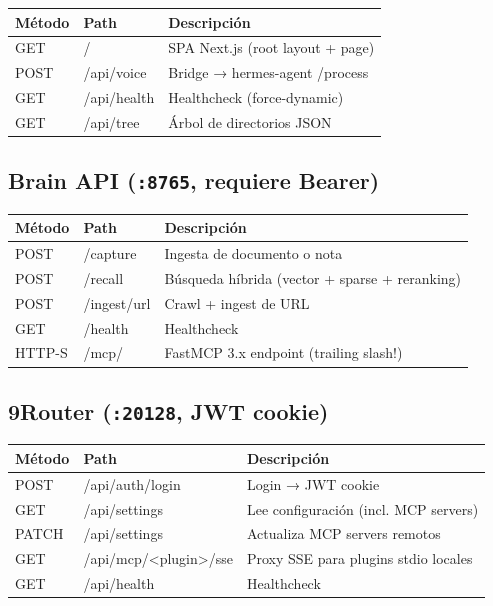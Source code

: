 \documentclass[11pt,a4paper]{article}
\begin{document}
\begin{center}
\begin{tabular}{|l|l|l|}
\hline
\rowcolor{hermesblue}\color{white}\textbf{Método} & \color{white}\textbf{Path} & \color{white}\textbf{Descripción}\\
\hline
GET & / & SPA Next.js (root layout + page)\\
POST & /api/voice & Bridge → hermes-agent /process\\
GET & /api/health & Healthcheck (force-dynamic)\\
GET & /api/tree & Árbol de directorios JSON\\
\hline
\end{tabular}
\end{center}

\subsection{Brain API (\texttt{:8765}, requiere Bearer)}

\begin{center}
\begin{tabular}{|l|l|l|}
\hline
\rowcolor{hermesblue}\color{white}\textbf{Método} & \color{white}\textbf{Path} & \color{white}\textbf{Descripción}\\
\hline
POST & /capture & Ingesta de documento o nota\\
POST & /recall & Búsqueda híbrida (vector + sparse + reranking)\\
POST & /ingest/url & Crawl + ingest de URL\\
GET & /health & Healthcheck\\
HTTP-S & /mcp/ & FastMCP 3.x endpoint (trailing slash!)\\
\hline
\end{tabular}
\end{center}

\subsection{9Router (\texttt{:20128}, JWT cookie)}

\begin{center}
\begin{tabular}{|l|l|l|}
\hline
\rowcolor{hermesblue}\color{white}\textbf{Método} & \color{white}\textbf{Path} & \color{white}\textbf{Descripción}\\
\hline
POST & /api/auth/login & Login → JWT cookie\\
GET & /api/settings & Lee configuración (incl. MCP servers)\\
PATCH & /api/settings & Actualiza MCP servers remotos\\
GET & /api/mcp/<plugin>/sse & Proxy SSE para plugins stdio locales\\
GET & /api/health & Healthcheck\\
\hline
\end{tabular}
\end{center}
\end{document}
